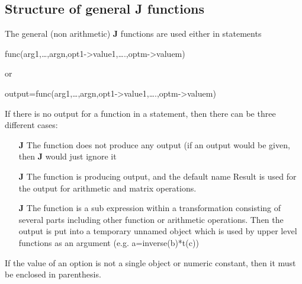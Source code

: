 \subsection{Structure of general \textbf{J} functions}
\label{jfunc}
The general (non arithmetic) \textbf{J} functions are used either in statements

func(arg1,…,argn,opt1->value1,….,optm->valuem)

or

output=func(arg1,…,argn,opt1->value1,….,optm->valuem)

If there is no output for a function in a statement, then there can be three different cases:
\begin{itemize}
\item[\textbf{J}] The function does not produce any output (if an output would be given, then \textbf{J} would just
ignore it

\item[\textbf{J}] The function is producing output, and the default name {Result} is used for the output
for arithmetic and matrix operations.
\item[\textbf{J}] The function is a sub expression within a transformation consisting of several parts including
other function or arithmetic operations. Then the output is put into a temporary unnamed
object which is used by upper level functions as an argument (e.g. a=\textcolor{VioletRed}{inverse}(b)*t(c))
\end{itemize}
If the value of an option is not a single object or numeric constant, then it must be enclosed in
parenthesis.

